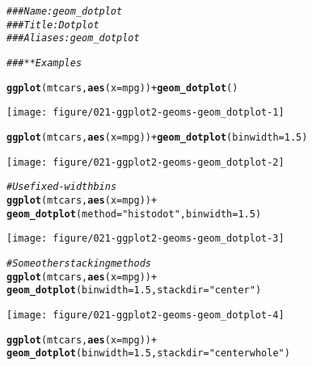 \documentclass[a4paper,titlepage]{tufte-handout}\usepackage[]{graphicx}\usepackage[]{color}
\makeatletter
\def\maxwidth{ %
  \ifdim\Gin@nat@width>\linewidth
    \linewidth
  \else
    \Gin@nat@width
  \fi
}
\newcommand{\hlnum}[1]{\textcolor[rgb]{0.686,0.059,0.569}{#1}}%
\newcommand{\hlstr}[1]{\textcolor[rgb]{0.192,0.494,0.8}{#1}}%
\newcommand{\hlcom}[1]{\textcolor[rgb]{0.678,0.584,0.686}{\textit{#1}}}%
\newcommand{\hlopt}[1]{\textcolor[rgb]{0,0,0}{#1}}%
\newcommand{\hlstd}[1]{\textcolor[rgb]{0.345,0.345,0.345}{#1}}%
\newcommand{\hlkwc}[1]{\textcolor[rgb]{0.333,0.667,0.333}{#1}}%
\newcommand{\hlkwd}[1]{\textcolor[rgb]{0.737,0.353,0.396}{\textbf{#1}}}%
\newenvironment{kframe}{%
 \def\at@end@of@kframe{}%
 \ifinner\ifhmode%
  \def\at@end@of@kframe{\end{minipage}}%
  \begin{minipage}{\columnwidth}%
 \fi\fi%
 \def\FrameCommand##1{\hskip\@totalleftmargin \hskip-\fboxsep
 \colorbox{shadecolor}{##1}\hskip-\fboxsep
     \hskip-\linewidth \hskip-\@totalleftmargin \hskip\columnwidth}%
 \MakeFramed {\advance\hsize-\width
   \@totalleftmargin\z@ \linewidth\hsize
   \@setminipage}}%
 {\par\unskip\endMakeFramed%
 \at@end@of@kframe}
\newenvironment{knitrout}{}{} %
\makeatother
\begin{document}
\begin{knitrout}
\color{fgcolor}\begin{kframe}
\begin{alltt}
\hlcom{### Name: geom_dotplot}
\hlcom{### Title: Dot plot}
\hlcom{### Aliases: geom_dotplot}

\hlcom{### ** Examples}

\hlkwd{ggplot}\hlstd{(mtcars,} \hlkwd{aes}\hlstd{(}\hlkwc{x} \hlstd{= mpg))} \hlopt{+} \hlkwd{geom_dotplot}\hlstd{()}
\end{alltt}
\end{kframe}
\texttt{[image: figure/021-ggplot2-geoms-geom\_dotplot-1]} 
\begin{kframe}\begin{alltt}
\hlkwd{ggplot}\hlstd{(mtcars,} \hlkwd{aes}\hlstd{(}\hlkwc{x} \hlstd{= mpg))} \hlopt{+} \hlkwd{geom_dotplot}\hlstd{(}\hlkwc{binwidth} \hlstd{=} \hlnum{1.5}\hlstd{)}
\end{alltt}
\end{kframe}
\texttt{[image: figure/021-ggplot2-geoms-geom\_dotplot-2]} 
\begin{kframe}\begin{alltt}
\hlcom{# Use fixed-width bins}
\hlkwd{ggplot}\hlstd{(mtcars,} \hlkwd{aes}\hlstd{(}\hlkwc{x} \hlstd{= mpg))} \hlopt{+}
  \hlkwd{geom_dotplot}\hlstd{(}\hlkwc{method}\hlstd{=}\hlstr{"histodot"}\hlstd{,} \hlkwc{binwidth} \hlstd{=} \hlnum{1.5}\hlstd{)}
\end{alltt}
\end{kframe}
\texttt{[image: figure/021-ggplot2-geoms-geom\_dotplot-3]} 
\begin{kframe}\begin{alltt}
\hlcom{# Some other stacking methods}
\hlkwd{ggplot}\hlstd{(mtcars,} \hlkwd{aes}\hlstd{(}\hlkwc{x} \hlstd{= mpg))} \hlopt{+}
  \hlkwd{geom_dotplot}\hlstd{(}\hlkwc{binwidth} \hlstd{=} \hlnum{1.5}\hlstd{,} \hlkwc{stackdir} \hlstd{=} \hlstr{"center"}\hlstd{)}
\end{alltt}
\end{kframe}
\texttt{[image: figure/021-ggplot2-geoms-geom\_dotplot-4]} 
\begin{kframe}\begin{alltt}
\hlkwd{ggplot}\hlstd{(mtcars,} \hlkwd{aes}\hlstd{(}\hlkwc{x} \hlstd{= mpg))} \hlopt{+}
  \hlkwd{geom_dotplot}\hlstd{(}\hlkwc{binwidth} \hlstd{=} \hlnum{1.5}\hlstd{,} \hlkwc{stackdir} \hlstd{=} \hlstr{"centerwhole"}\hlstd{)}
\end{alltt}

\end{kframe}
\end{knitrout}
\end{document}
